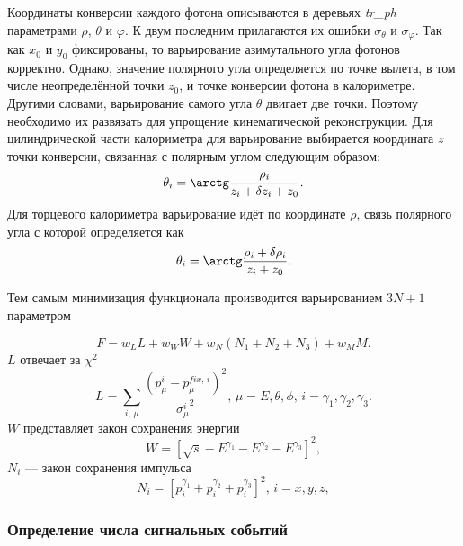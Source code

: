 Координаты конверсии каждого фотона описываются в деревьях \textit{tr\_ph} параметрами $\rho$, $\theta$ и $\varphi$.
К двум последним прилагаются их ошибки $\sigma_\theta$ и $\sigma_\varphi$.
Так как $x_0$ и $y_0$ фиксированы,
то варьирование азимутального угла фотонов корректно.
Однако,
значение полярного угла определяется по точке вылета,
в том числе неопределённой точки $z_0$,
и точке конверсии фотона в калориметре.
Другими словами,
варьирование самого угла $\theta$ двигает две точки.
Поэтому необходимо их развязать для упрощение кинематической реконструкции.
Для цилиндрической части калориметра для варьирование выбирается координата $z$ точки конверсии,
связанная с полярным углом следующим образом:
\begin{equation}
    \theta_i
    =
    \arctg
    \frac{\rho_i}{z_i + \delta z_i + z_0} .
\end{equation}
Для торцевого калориметра варьирование идёт по координате $\rho$,
связь полярного угла с которой определяется как
\begin{equation}
    \theta_i
    =
    \arctg
    \frac{\rho_i + \delta \rho_i}{z_i + z_0} .
\end{equation}

Тем самым минимизация функционала производится варьированием $3 N + 1$ параметром



\begin{equation}
F = w_L L + w_W W + w_N \left( N_1 + N_2 + N_3 \right) + w_M M.
\end{equation}
$L$ отвечает за $\chi^{2}$
\begin{equation}
	L
	= 
	\sum_{i, \, \mu} 
	\frac{ \left( p^{i}_\mu -p^{fix,\,i}_\mu \right)^2 }{{\sigma^i_\mu}^2} , 
	\, \mu = E, \theta, \phi, \, i = \gamma_1, \gamma_2, \gamma_3.
\end{equation}
$W$ представляет закон сохранения энергии
\begin{equation}
	W = \left[ \sqrt{s} - E^{\gamma_1}- E^{\gamma_2}- E^{\gamma_3} \right]^2 ,
\end{equation}
$N_i$ --- закон сохранения импульса
\begin{equation}
	N_i = \left[ p_i^{\gamma_1} + p_i^{\gamma_2} + p_i^{\gamma_3} \right]^2, \, i=x,y,z ,
\end{equation}



\subsubsection{Определение числа сигнальных событий}

